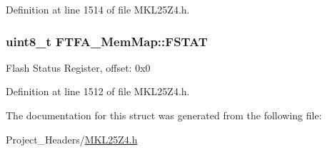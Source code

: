 Definition at line 1514 of file M\+K\+L25\+Z4.\+h.

\subsubsection[{\texorpdfstring{F\+S\+T\+AT}{FSTAT}}]{\setlength{\rightskip}{0pt plus 5cm}uint8\+\_\+t F\+T\+F\+A\+\_\+\+Mem\+Map\+::\+F\+S\+T\+AT}\hypertarget{struct_f_t_f_a___mem_map_ad0320d81996a5bd9b58e1d4421afc8c1}{}\label{struct_f_t_f_a___mem_map_ad0320d81996a5bd9b58e1d4421afc8c1}
Flash Status Register, offset\+: 0x0 

Definition at line 1512 of file M\+K\+L25\+Z4.\+h.



The documentation for this struct was generated from the following file\+:\begin{DoxyCompactItemize}
\item 
Project\+\_\+\+Headers/\hyperlink{_m_k_l25_z4_8h}{M\+K\+L25\+Z4.\+h}\end{DoxyCompactItemize}
